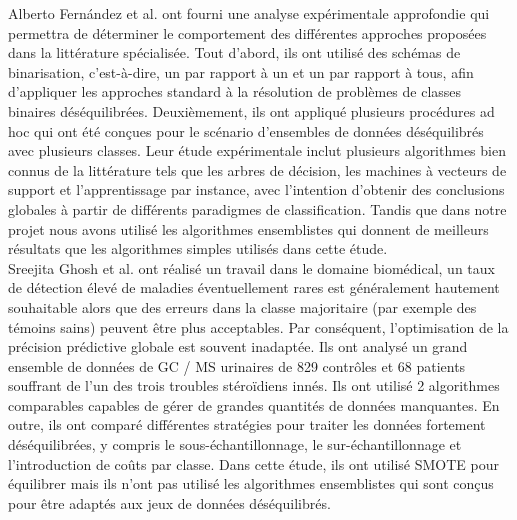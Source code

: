 \documentclass[12pt, french]{report}
\begin{document}
Alberto Fernández et al. \cite{key30} ont fourni une analyse expérimentale approfondie qui permettra de déterminer le comportement des différentes approches proposées dans la littérature spécialisée. Tout d'abord, ils ont utilisé des schémas de binarisation, c'est-à-dire, un par rapport à un et un par rapport à tous, afin d'appliquer les approches standard à la résolution de problèmes de classes binaires déséquilibrées. Deuxièmement, ils ont appliqué plusieurs procédures ad hoc qui ont été conçues pour le scénario d'ensembles de données déséquilibrés avec plusieurs classes. Leur étude expérimentale inclut plusieurs algorithmes bien connus de la littérature tels que les arbres de décision, les machines à vecteurs de support et l'apprentissage par instance, avec l'intention d'obtenir des conclusions globales à partir de différents paradigmes de classification. Tandis que dans notre projet nous avons utilisé les algorithmes ensemblistes qui donnent de meilleurs résultats que les algorithmes simples utilisés dans cette étude.\\

Sreejita Ghosh et al.  \cite{key31} ont réalisé un travail dans le domaine biomédical, un taux de détection élevé de maladies éventuellement rares est généralement hautement souhaitable alors que des erreurs dans la classe majoritaire (par exemple des témoins sains) peuvent être plus acceptables. Par conséquent, l'optimisation de la précision prédictive globale est souvent inadaptée. Ils ont analysé un grand ensemble de données de GC / MS urinaires de 829 contrôles et 68 patients souffrant de l'un des trois troubles stéroïdiens innés. Ils ont utilisé 2 algorithmes comparables capables de gérer de grandes quantités de données manquantes. En outre, ils ont comparé différentes stratégies pour traiter les données fortement déséquilibrées, y compris le sous-échantillonnage, le sur-échantillonnage et l'introduction de coûts par classe. Dans cette étude, ils ont utilisé SMOTE pour équilibrer mais ils n'ont pas utilisé les algorithmes ensemblistes qui sont conçus pour être adaptés aux jeux de données déséquilibrés. \\
\end{document}

